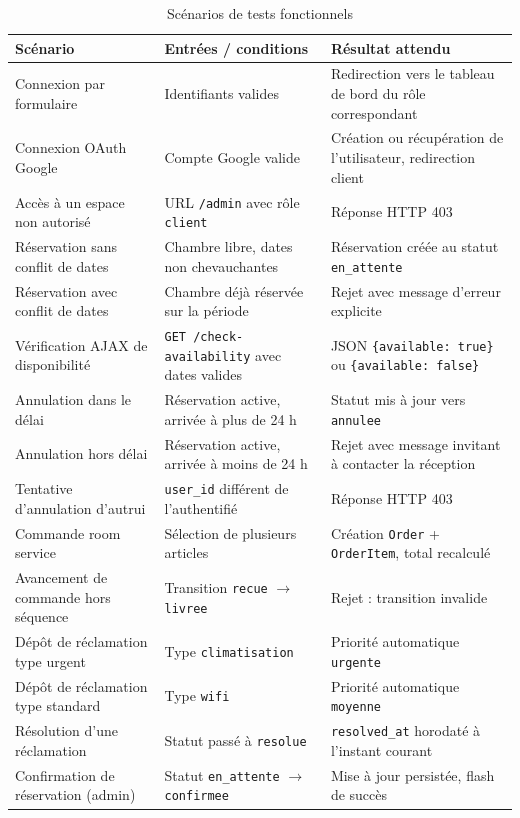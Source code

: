 \documentclass[12pt,a4paper]{report}
\begin{document}
\begin{table}[h]
    \centering
    \caption{Scénarios de tests fonctionnels}
    \label{tab:tests}
    \begin{tabular}{|p{5.5cm}|p{4cm}|p{4cm}|}
        \hline
        \textbf{Scénario} & \textbf{Entrées / conditions} & \textbf{Résultat attendu} \\
        \hline
        Connexion par formulaire & Identifiants valides & Redirection vers le tableau de bord du rôle correspondant \\
        \hline
        Connexion OAuth Google & Compte Google valide & Création ou récupération de l'utilisateur, redirection client \\
        \hline
        Accès à un espace non autorisé & URL \texttt{/admin} avec rôle \texttt{client} & Réponse HTTP 403 \\
        \hline
        Réservation sans conflit de dates & Chambre libre, dates non chevauchantes & Réservation créée au statut \texttt{en\_attente} \\
        \hline
        Réservation avec conflit de dates & Chambre déjà réservée sur la période & Rejet avec message d'erreur explicite \\
        \hline
        Vérification AJAX de disponibilité & \texttt{GET /check-availability} avec dates valides & JSON \texttt{\{available: true\}} ou \texttt{\{available: false\}} \\
        \hline
        Annulation dans le délai & Réservation active, arrivée à plus de 24 h & Statut mis à jour vers \texttt{annulee} \\
        \hline
        Annulation hors délai & Réservation active, arrivée à moins de 24 h & Rejet avec message invitant à contacter la réception \\
        \hline
        Tentative d'annulation d'autrui & \texttt{user\_id} différent de l'authentifié & Réponse HTTP 403 \\
        \hline
        Commande room service & Sélection de plusieurs articles & Création \texttt{Order} + \texttt{OrderItem}, total recalculé \\
        \hline
        Avancement de commande hors séquence & Transition \texttt{recue} $\rightarrow$ \texttt{livree} & Rejet : transition invalide \\
        \hline
        Dépôt de réclamation type urgent & Type \texttt{climatisation} & Priorité automatique \texttt{urgente} \\
        \hline
        Dépôt de réclamation type standard & Type \texttt{wifi} & Priorité automatique \texttt{moyenne} \\
        \hline
        Résolution d'une réclamation & Statut passé à \texttt{resolue} & \texttt{resolved\_at} horodaté à l'instant courant \\
        \hline
        Confirmation de réservation (admin) & Statut \texttt{en\_attente} $\rightarrow$ \texttt{confirmee} & Mise à jour persistée, flash de succès \\
        \hline
    \end{tabular}
\end{table}
\end{document}

